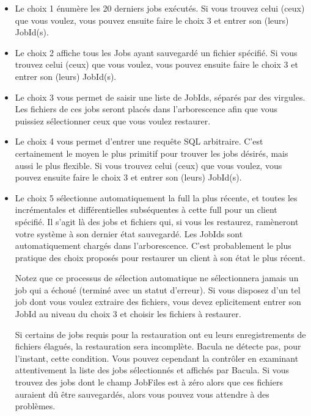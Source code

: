 \begin{itemize}
\item Le choix 1 \'enum\`ere les 20 derniers jobs ex\'ecut\'es. Si vous trouvez 
   celui (ceux) que vous voulez, vous pouvez ensuite faire le choix 3 et entrer 
   son (leurs) JobId(s).

\item Le choix 2 affiche tous les Jobs ayant sauvegard\'e un fichier 
   sp\'ecifi\'e. Si vous trouvez celui (ceux) que vous voulez, vous pouvez ensuite 
   faire le choix 3 et entrer son (leurs) JobId(s).

\item Le choix 3 vous permet de saisir une liste de JobIds, s\'epar\'es par des 
   virgules. Les fichiers de ces jobs seront plac\'es dans l'arborescence afin 
   que vous puissiez s\'electionner ceux que vous voulez restaurer.

\item Le choix 4 vous permet d'entrer une requ\^ete SQL arbitraire. C'est 
   certainement le moyen le plus primitif pour trouver les jobs d\'esir\'es, 
   mais aussi le plus flexible. Si vous trouvez celui (ceux) que vous voulez, 
   vous pouvez ensuite faire le choix 3 et entrer son (leurs) JobId(s).
      
\item Le choix 5 s\'electionne automatiquement la full la plus r\'ecente, et toutes 
   les incr\'ementales et diff\'erentielles subs\'equentes \`a cette full pour un 
   client sp\'ecifi\'e. Il s'agit l\`a des jobs et fichiers qui, si vous les 
   restaurez, ram\`eneront votre syst\`eme \`a son dernier \'etat sauvegard\'e. 
   Les JobIds sont automatiquement charg\'es dans l'arborescence. C'est 
   probablement le plus pratique des choix propos\'es pour restaurer un 
   client \`a son \'etat le plus r\'ecent.

   Notez que ce processus de s\'election automatique ne s\'electionnera jamais 
   un job qui a \'echou\'e (termin\'e avec un statut d'erreur). Si vous disposez 
   d'un tel job dont vous voulez extraire des fichiers, vous devez 
   eplicitement entrer son JobId au niveau du choix 3 et choisir les fichiers 
   \`a restaurer.
   
   Si certains de jobs requis pour la restauration ont eu leurs enregistrements 
   de fichiers \'elagu\'es, la restauration sera incompl\`ete. Bacula ne d\'etecte 
   pas, pour l'instant, cette condition. Vous pouvez cependant la 
   contr\^oler en examinant attentivement la liste des jobs s\'electionn\'es 
   et affich\'es par Bacula. Si vous trouvez des jobs dont le champ JobFiles 
   est \`a z\'ero alors que ces fichiers auraient d\^u \^etre sauvegard\'es, alors 
   vous pouvez vous attendre \`a des probl\`emes.
   

\end{itemize}
